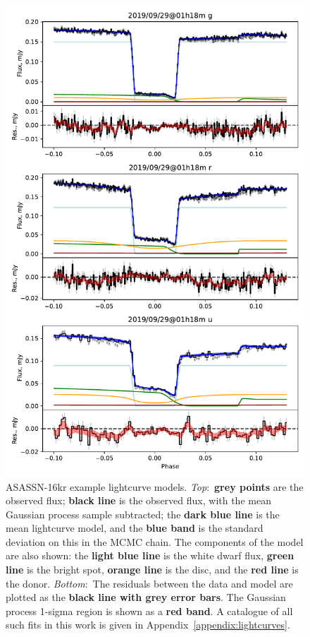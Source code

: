 \begin{figure}
    \centering
    \includegraphics[width=.6\textwidth]{figures/results/three_cvs_with_weird_colours/ASASSN-16kr/ASASSN-16kr_6.pdf}
    \caption{ASASSN-16kr example lightcurve models. {\it Top}:~{\bf grey points} are the observed flux; {\bf black line} is the observed flux, with the mean Gaussian process sample subtracted; the {\bf dark blue line} is the mean lightcurve model, and the {\bf blue band} is the standard deviation on this in the MCMC chain. The components of the model are also shown: the {\bf light blue line} is the white dwarf flux, {\bf green line} is the bright spot, {\bf orange line} is the disc, and the {\bf red line} is the donor. {\it Bottom}:~The residuals between the data and model are plotted as the {\bf black line with grey error bars}. The Gaussian process 1-sigma region is shown as a {\bf red band}. A catalogue of all such fits in this work is given in Appendix~\ref{appendix:lightcurves}.}
    \label{fig:three white dwarfs:ASASSN-16kr example lightcurves}
\end{figure}

